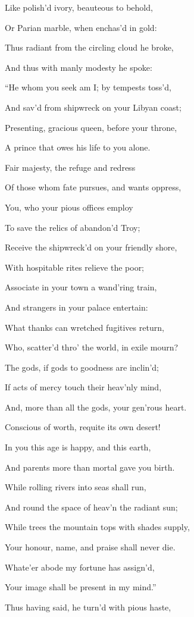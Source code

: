 Like polish’d ivory, beauteous to behold,

Or Parian marble, when enchas’d in gold:

Thus radiant from the circling cloud he broke,

And thus with manly modesty he spoke:

“He whom you seek am I; by tempests toss’d,

And sav’d from shipwreck on your Libyan coast;

Presenting, gracious queen, before your throne,

A prince that owes his life to you alone.

Fair majesty, the refuge and redress

Of those whom fate pursues, and wants oppress,

You, who your pious offices employ

To save the relics of abandon’d Troy;

Receive the shipwreck’d on your friendly shore,

With hospitable rites relieve the poor;

Associate in your town a wand’ring train,

And strangers in your palace entertain:

What thanks can wretched fugitives return,

Who, scatter’d thro’ the world, in exile mourn?

The gods, if gods to goodness are inclin’d;

If acts of mercy touch their heav’nly mind,

And, more than all the gods, your gen’rous heart.

Conscious of worth, requite its own desert!

In you this age is happy, and this earth,

And parents more than mortal gave you birth.

While rolling rivers into seas shall run,

And round the space of heav’n the radiant sun;

While trees the mountain tops with shades supply,

Your honour, name, and praise shall never die.

Whate’er abode my fortune has assign’d,

Your image shall be present in my mind.”

Thus having said, he turn’d with pious haste,

